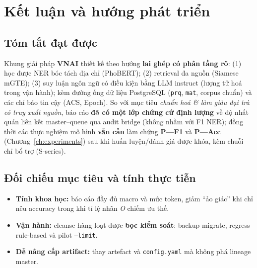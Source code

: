 \chapter{Kết luận và hướng phát triển}
\label{ch:conclusion}

\section{Tóm tắt đạt được}
Khung giải pháp \textbf{VNAI} thiết kế theo hướng \textbf{lai ghép có phân tầng rõ}: (1) học được NER bóc tách địa chỉ (PhoBERT); (2) retrieval đa nguồn (Siamese mGTE); (3) suy luận ngôn ngữ có điều kiện bằng LLM instruct (lượng tử hoá trong vận hành); kèm đường ống dữ liệu PostgreSQL (\texttt{prq}, \texttt{mat}, corpus chuẩn) và các chỉ báo tin cậy (ACS, Epoch). So với mục tiêu \textit{chuẩn hoá \& làm giàu đại trà có truy xuất nguồn}, báo cáo \textbf{đã có một lớp chứng cứ định lượng} về độ nhất quán liên kết master--queue qua audit bridge (không nhầm với F1 NER); đồng thời các thực nghiệm mô hình \textbf{vẫn cần} làm chứng \textbf{P---F1} và \textbf{P---Acc} (Chương~\ref{ch:experiments}) sau khi huấn luyện/đánh giá được khóa, kèm chuỗi chỉ bổ trợ (S-series).

\section{Đối chiếu mục tiêu và tính thực tiễn}
\begin{itemize}
  \item \textbf{Tính khoa học:} báo cáo đầy đủ macro và mức token, giảm ``ảo giác'' khi chỉ nêu accuracy trong khi tỉ lệ nhãn \emph{O} chiếm ưu thế.
  \item \textbf{Vận hành:} cleanse hàng loạt được \textbf{bọc kiểm soát}: backup migrate, regress rule-based và pilot \texttt{--limit}.
  \item \textbf{Dễ nâng cấp artifact:} thay artefact và \texttt{config.yaml} mà không phá lineage master.
\end{itemize}

